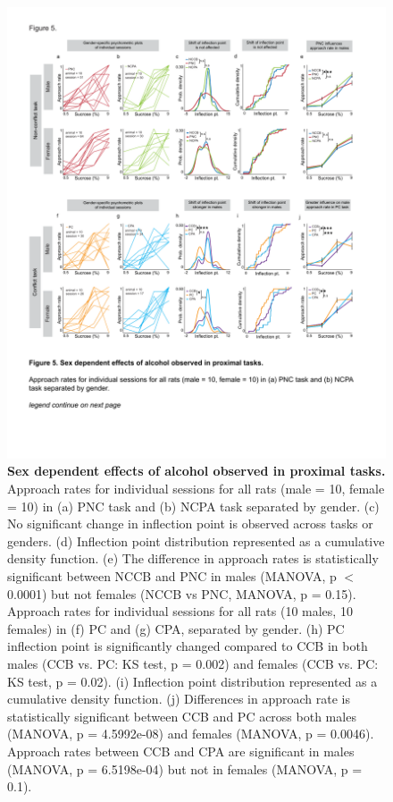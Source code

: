 \documentclass{article}
\begin{document}
\begin{figure}[H] %
  \centering
  \includegraphics[width=\textwidth, trim=50 100 50 100]{Figs/Alcohol_main_5.pdf}
  \caption{\textbf{Sex dependent effects of alcohol observed in proximal tasks.} Approach rates for individual sessions for all rats (male = 10, female = 10) in (a) PNC task and (b) NCPA task separated by gender. (c) No significant change in inflection point is observed across tasks or genders. (d) Inflection point distribution represented as a cumulative density function. (e) The difference in approach rates is statistically significant between NCCB and PNC in males (MANOVA, p $<$ 0.0001) but not females (NCCB vs PNC, MANOVA, p = 0.15). Approach rates for individual sessions for all rats (10 males, 10 females) in (f) PC and (g) CPA, separated by gender. (h) PC inflection point is significantly changed compared to CCB in both males (CCB vs. PC: KS test, p = 0.002) and females (CCB vs. PC: KS test, p = 0.02). (i) Inflection point distribution represented as a cumulative density function. (j) Differences in approach rate is statistically significant between CCB and PC across both males (MANOVA, p = 4.5992e-08) and females (MANOVA, p = 0.0046). Approach rates between CCB and CPA are significant in males (MANOVA, p = 6.5198e-04) but not in females (MANOVA, p = 0.1).}
  \label{fig:alcohol_main_5}
\end{figure}
\end{document}
